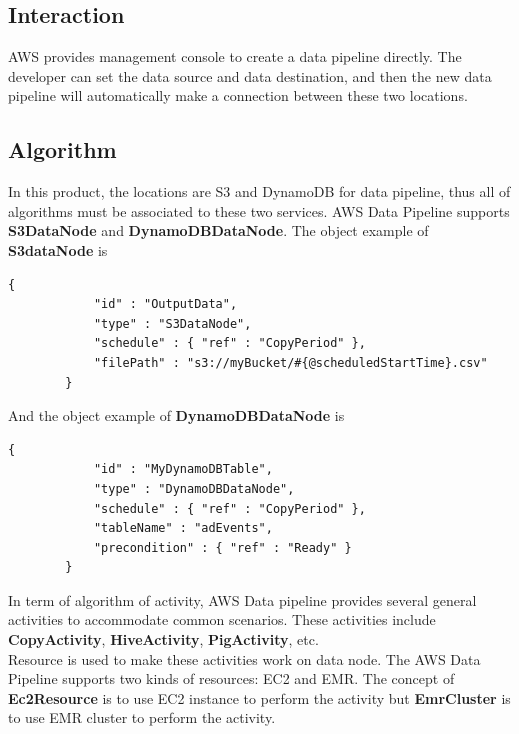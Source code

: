 	\subsection{Interaction}
	AWS provides management console to create a data pipeline directly. The developer can set the data source and data destination, and then the new data pipeline will automatically make  a connection between these two locations.  
    
\subsection{ Algorithm}
	In this product, the locations are S3 and DynamoDB for data pipeline, thus all of algorithms must be associated to these two services. AWS Data Pipeline supports \textbf{S3DataNode} and \textbf{DynamoDBDataNode}. The  object example of \textbf{S3dataNode} is
	\begin{lstlisting}[caption=S3 Data Node example\cite{z6}]
        {
            "id" : "OutputData",
            "type" : "S3DataNode",
            "schedule" : { "ref" : "CopyPeriod" },
            "filePath" : "s3://myBucket/#{@scheduledStartTime}.csv"
        }
	\end{lstlisting}
	And the object example of \textbf{DynamoDBDataNode} is 
	\begin{lstlisting}[caption=DynamoDB Data Node example\cite{z7}]
        {
            "id" : "MyDynamoDBTable",
            "type" : "DynamoDBDataNode",
            "schedule" : { "ref" : "CopyPeriod" },
            "tableName" : "adEvents",
            "precondition" : { "ref" : "Ready" }
        }
	\end{lstlisting}
	In term of algorithm of activity, AWS Data pipeline provides several general activities to accommodate common scenarios. These activities include \textbf{CopyActivity}, \textbf{HiveActivity}, \textbf{PigActivity}, etc.\\ 
    
    \noindent Resource is used to make these activities work on data node. The AWS Data Pipeline supports two kinds of resources: EC2 and EMR. The concept of \textbf{Ec2Resource} is to use EC2 instance to perform the activity but \textbf{EmrCluster} is to use EMR cluster to perform the activity. 

